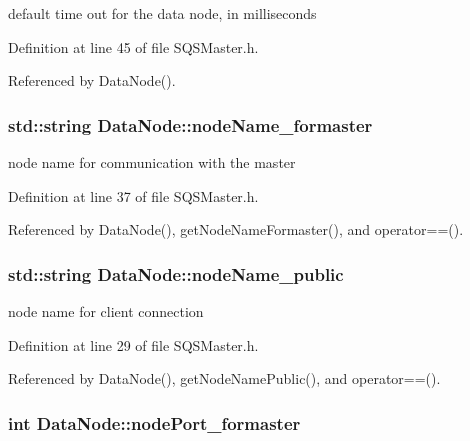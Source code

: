 default time out for the data node, in milliseconds 



\-Definition at line 45 of file \-S\-Q\-S\-Master.\-h.



\-Referenced by \-Data\-Node().

\hypertarget{classDataNode_a3d6d0ffea35a5806fc86c4aa5484f2f2}{
\subsubsection[{node\-Name\-\_\-formaster}]{\setlength{\rightskip}{0pt plus 5cm}std\-::string {\bf \-Data\-Node\-::node\-Name\-\_\-formaster}}}\label{d7/d25/classDataNode_a3d6d0ffea35a5806fc86c4aa5484f2f2}


node name for communication with the master 



\-Definition at line 37 of file \-S\-Q\-S\-Master.\-h.



\-Referenced by \-Data\-Node(), get\-Node\-Name\-Formaster(), and operator==().

\hypertarget{classDataNode_afc6ee468a328c1f6004e81ddf123804b}{
\subsubsection[{node\-Name\-\_\-public}]{\setlength{\rightskip}{0pt plus 5cm}std\-::string {\bf \-Data\-Node\-::node\-Name\-\_\-public}}}\label{d7/d25/classDataNode_afc6ee468a328c1f6004e81ddf123804b}


node name for client connection 



\-Definition at line 29 of file \-S\-Q\-S\-Master.\-h.



\-Referenced by \-Data\-Node(), get\-Node\-Name\-Public(), and operator==().

\hypertarget{classDataNode_aa0047e3d31e28ca707f46138ded5f152}{
\subsubsection[{node\-Port\-\_\-formaster}]{\setlength{\rightskip}{0pt plus 5cm}int {\bf \-Data\-Node\-::node\-Port\-\_\-formaster}}}\label{d7/d25/classDataNode_aa0047e3d31e28ca707f46138ded5f152}



